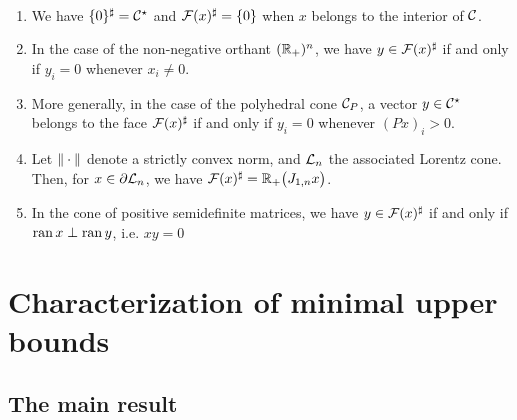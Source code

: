 \documentclass[main]{subfiles}
\begin{document}
\begin{example}~
\begin{enumerate}
\item We have $\{0\}^\sharp = \mathcal{C}^\star$ and  $\mathcal{F}(x)^\sharp = \{0\}$ when $x$ belongs to the interior of $\mathcal{C}$.
\item In the case of the non-negative orthant $(\mathbb{R}_+)^n$, we have $y \in \mathcal{F}(x)^\sharp$ if and only if $y_i = 0$ whenever $x_i \neq 0$. 
\item More generally, in the case of the polyhedral cone $\mathcal{C}_P$, a vector $y \in \mathcal{C}^\star$ belongs to the face $\mathcal{F}(x)^\sharp$ 
if and only if $y_i = 0$ whenever $(Px)_i > 0$.
\item Let $\| \cdot \|$ denote a strictly convex norm, and $\mathcal{L}_n$ the associated Lorentz cone. Then, for $x \in \partial\mathcal{L}_n$, we have $\mathcal{F}(x)^\sharp = \mathbb{R}_+ \big( J_{1,n}x \big)$.
\item In the cone of positive semidefinite matrices, we have $y \in \mathcal{F}(x)^\sharp$ if and only if $\operatorname{ran} x \perp \operatorname{ran} y$, i.e. $xy = 0$
\end{enumerate}
\end{example}

\section{Characterization of minimal upper bounds}
\label{sec:mub_cone_char}

\subsection{The main result}
\end{document}
